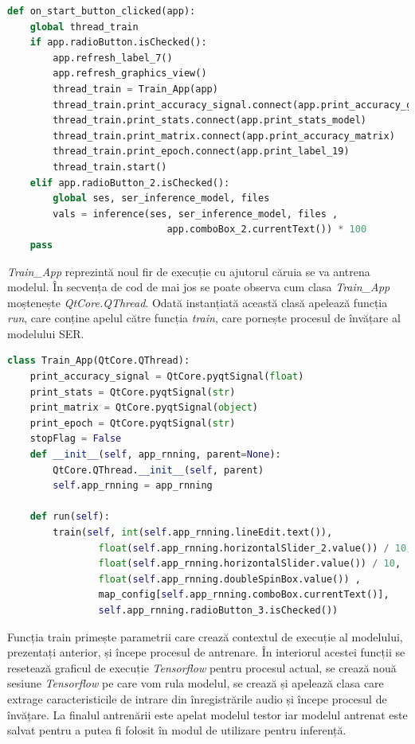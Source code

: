 \documentclass[a4paper,12pt]{book}
\begin{document}
		\begin{lstlisting}[language=Python, caption={Metoda interfetei grafice apelata automat in urma apasarii butonului Start.}, label=on_click]	
def on_start_button_clicked(app):
	global thread_train
	if app.radioButton.isChecked():
		app.refresh_label_7()
		app.refresh_graphics_view()
		thread_train = Train_App(app)
		thread_train.print_accuracy_signal.connect(app.print_accuracy_graph)
		thread_train.print_stats.connect(app.print_stats_model)
		thread_train.print_matrix.connect(app.print_accuracy_matrix)
		thread_train.print_epoch.connect(app.print_label_19)
		thread_train.start()
	elif app.radioButton_2.isChecked():
		global ses, ser_inference_model, files
		vals = inference(ses, ser_inference_model, files ,
							app.comboBox_2.currentText()) * 100
	pass \end{lstlisting}
		\textit{Train\_App} reprezintă noul fir de execuție cu ajutorul căruia se va antrena modelul. În secvența de cod de mai jos se poate observa cum clasa \textit{Train\_App} moștenește \textit{QtCore.QThread}. Odată instanțiată această clasă apelează funcția \textit{run}, care conține apelul către funcția \textit{train}, care pornește procesul de învățare al modelului SER.
		\begin{lstlisting}[language=Python, caption={Clasa aferenta firului de executie pentru procesul de antrenare.}]	
class Train_App(QtCore.QThread):
	print_accuracy_signal = QtCore.pyqtSignal(float)
	print_stats = QtCore.pyqtSignal(str)
	print_matrix = QtCore.pyqtSignal(object)
	print_epoch = QtCore.pyqtSignal(str)
	stopFlag = False
	def __init__(self, app_rnning, parent=None):
		QtCore.QThread.__init__(self, parent)
		self.app_rnning = app_rnning
		
	def run(self):
		train(self, int(self.app_rnning.lineEdit.text()),
				float(self.app_rnning.horizontalSlider_2.value()) / 10,  
				float(self.app_rnning.horizontalSlider.value()) / 10, 
				float(self.app_rnning.doubleSpinBox.value()) ,
				map_config[self.app_rnning.comboBox.currentText()], 
				self.app_rnning.radioButton_3.isChecked()) \end{lstlisting}
		Funcția train primește parametrii care crează contextul de execuție al modelului, prezentați anterior, și începe procesul de antrenare. În interiorul acestei funcții se resetează graficul de execuție \textit{Tensorflow} pentru procesul actual, se crează nouă sesiune \textit{Tensorflow}  pe care vom rula modelul, se crează și apelează clasa care extrage caracteristicile de intrare din înregistrările audio și începe procesul de învățare. La finalul antrenării este apelat modelul testor iar modelul antrenat este salvat pentru a putea fi folosit în modul de utilizare pentru inferență. \par
		
\end{document}
